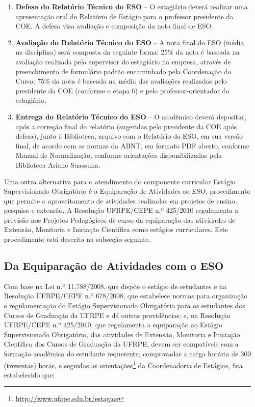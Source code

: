 \documentclass[
	12pt,				%
	openright,			%
  oneside,     %
	a4paper,			%
	english,			%
	french,				%
	spanish,			%
	brazil				%
	]{abntex2}
\begin{document}
\begin{enumerate}
    \item \textbf{Defesa do Relatório Técnico do ESO} – O estagiário deverá realizar uma apresentação oral do Relatório de Estágio para o professor presidente da COE. A defesa visa avaliação e composição da nota final de ESO.
    \item \textbf{Avaliação do Relatório Técnico do ESO} – A nota final do ESO (média na disciplina) será composta da seguinte forma: 25\% da nota é baseada na avaliação realizada pelo supervisor do estagiário na empresa, através de preenchimento de formulário padrão encaminhado pela Coordenação do Curso; 75\% da nota é baseada na média das avaliações realizadas pelo presidente da COE (conforme o etapa 6) e pelo professor-orientador do estagiário.
    \item \textbf{Entrega do Relatório Técnico do ESO} – O acadêmico deverá depositar, após a correção final do relatório (sugeridas pelo presidente da COE após defesa), junto à Biblioteca, arquivo com o Relatório do ESO, em sua versão final, de acordo com as normas da ABNT, em formato PDF aberto, conforme Manual de Normalização, conforme orientações disponibilizadas pela Biblioteca Ariano Suassuna.
\end{enumerate}

Uma outra alternativa para o atendimento do componente curricular Estágio Supervisionado Obrigatório é a Equiparação de Atividades ao ESO, procedimento que permite o aproveitamento de atividades realizadas em projetos de ensino, pesquisa e extensão. A Resolução UFRPE/CEPE n.º 425/2010 regulamenta a previsão nos Projetos Pedagógicos de curso da equiparação das atividades de Extensão, Monitoria e Iniciação Científica como estágios curriculares. Este procedimento está descrito na subseção seguinte.

\subsection{Da Equiparação de Atividades com o ESO}

Com base na Lei n.º 11.788/2008, que dispõe o estágio de estudantes e na Resolução UFRPE/CEPE n.º 678/2008, que estabelece normas para organização e regulamentação do Estágio Supervisionado Obrigatório para os estudantes dos Cursos de Graduação da UFRPE e dá outras providências; e, na Resolução UFRPE/CEPE n.º 425/2010, que regulamenta a equiparação ao Estágio Supervisionado Obrigatório, das atividades de Extensão, Monitoria e Iniciação Científica dos Cursos de Graduação da UFRPE, devem ser compatíveis com a formação acadêmica do estudante requerente, comprovadas a carga horária de 300 (trezentas) horas, e seguidas as orientações\footnote{\href{http://www.ufape.edu.br/estagios}{http://www.ufape.edu.br/estagios}} da Coordenadoria de Estágios, fica estabelecido que:
\end{document}
